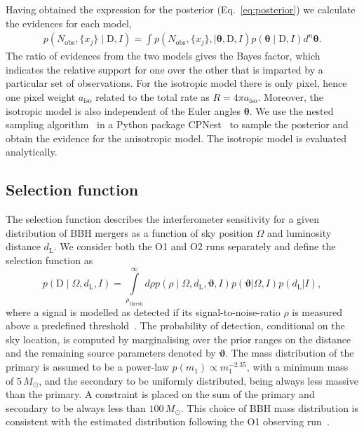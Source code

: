 \documentclass[usenatbib,useAMS]{mnras}
\newcommand{\Nobs}{\ensuremath{N_\mathrm{obs}}}
\begin{document}
Having obtained the expression for the posterior (Eq.~\ref{eq:posterior}) we
calculate the evidences for each model,
% 
\begin{align}\label{eq:evidence}
	p\left(\Nobs, \{x_j\} \mid \bm{\mathrm{D}}, I\right)
	=
	\int p\left(\Nobs, \{x_j\},\mid \bm{\theta}, \bm{\mathrm{D}}, I\right)
	p(\bm{\theta} \mid \bm{\mathrm{D}}, I)d^{n}\bm{\theta}.
\end{align}
% 
The ratio of evidences from the two models gives the Bayes factor, which
indicates the relative support for one over the other that is imparted by
a particular set of observations. For the isotropic model there is only pixel,
hence one pixel weight $a_{\text{iso}}$ related to the total rate as $R=4\pi
a_{\text{iso}}$. Moreover, the isotropic model is also independent of the Euler
angles $\bm{\theta}$. We use the nested sampling algorithm~\citep{skilling2006}
in a Python package CPNest~\citep{john_veitch_2017_835874} to sample
the posterior and obtain the evidence for the anisotropic model. The isotropic model
is evaluated analytically.

\subsection{Selection function}\label{subsec:probDet}
%
The selection function describes the interferometer sensitivity for a given
distribution of \ac{BBH} mergers as a function of sky position $\Omega$ and
luminosity distance $d_\mathrm{L}$. We consider both the O1 and O2 runs
separately and define the selection function as
%
\begin{equation}\label{eq:selection}
    p\left(\bm{\mathrm{D}} \mid \Omega, d_{\text{L}}, I\right)
    =
    \int\limits_{\rho_{\mathrm{thresh}}}^{\infty} d\rho
    p\left(\rho \mid \Omega,d_{\text{L}}, \bm{\vartheta}, I\right)
    p(\bm{\vartheta}|\Omega,I)p(d_{\text{L}}|I),
\end{equation}
% 
where a signal is modelled as detected if its signal-to-noise-ratio $\rho$ is
measured above a predefined threshold~\citep{H0paper}. The probability of
detection, conditional on the sky location, is computed by marginalising over
the prior ranges on the distance and the remaining source parameters denoted
by $\bm{\vartheta}$. The mass distribution of the primary is
assumed to be a power-law $p\left(m_1\right)\propto m_1^{-2.35}$, with a minimum
mass of $5\,M_\odot$, and the secondary to be uniformly distributed, being
always less massive than the primary. A constraint is placed on the
sum of the primary and secondary to be always less than $100\,M_\odot$. This
choice of BBH mass distribution is consistent with the estimated distribution
following the O1 observing run~\citep{O1BBH}.
\end{document}
